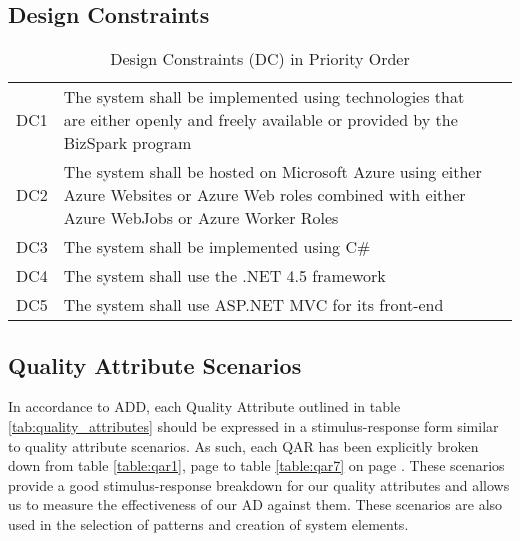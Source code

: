 \subsection{Design Constraints}
\begin{table}[!h]
\centering
\begin{tabularx}{\linewidth}{|l|X|l}
\cline{1-2}
DC1 & The system shall be implemented using technologies that are either openly and freely available or provided by the BizSpark program &   \\
DC2 & The system shall be hosted on Microsoft Azure using either Azure Websites or Azure Web roles combined with either Azure WebJobs or Azure Worker Roles &  \\
DC3 & The system shall be implemented using C\# &    \\
DC4 & The system  shall use the .NET 4.5 framework    \\
DC5 & The system shall use ASP.NET \index{ASP.NET} MVC for its front-end &    \\
\cline{1-2}
\end{tabularx}
\caption{Design Constraints (DC) in Priority Order}
\label{tab:design_constraints}
\end{table}


\subsection{Quality Attribute Scenarios}
In accordance to ADD, each Quality Attribute outlined in table \ref{tab:quality_attributes} should be expressed in a stimulus-response form similar to quality attribute scenarios. As such, each QAR has been explicitly broken down from table \ref{table:qar1}, page \pageref{table:qar1} to table \ref{table:qar7} on page \pageref{table:qar7}. These scenarios provide a good stimulus-response breakdown for our quality attributes and allows us to measure the effectiveness of our AD against them. These scenarios are also used in the selection of patterns and creation of system elements.

